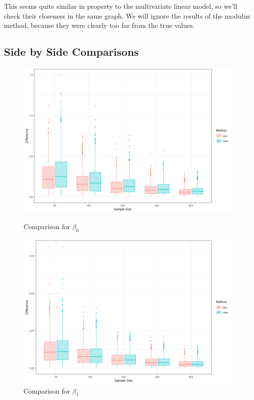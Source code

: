 \documentclass[honours,12pt]{unswthesis}
\numberwithin{equation}{section}
\begin{document}
\noindent This seems quite similar in property to the multivariate linear model, so we'll check their closeness in the same graph. We will ignore the results of the modulus method, because they were clearly too far from the true values. \par


\newpage

\subsection{Side by Side Comparisons}

\begin{figure}[hpb]
    \centering
    \begin{minipage}{0.5\textwidth}
        \centering
        \includegraphics[width=\textwidth]{graphics/b0_clm_mlm}
        \caption{Comparison for $\beta_{0}$}
    \end{minipage}\hfill
    \begin{minipage}{0.5\textwidth}
        \centering
        \includegraphics[width=\textwidth]{graphics/b1_clm_mlm} 
        \caption{Comparison for $\beta_{1}$}
    \end{minipage}
\end{figure}
\end{document}
